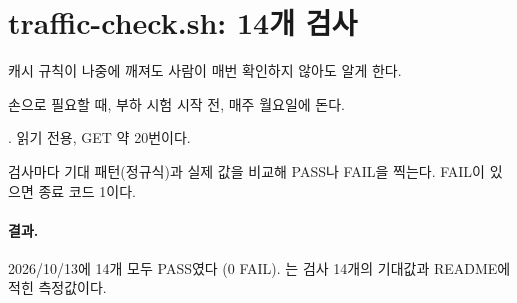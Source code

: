 \section{traffic-check.sh: 14개 검사}\label{sec:07-trafficcheck}

\begin{inbrief}
  \item[Why] 캐시 규칙이 나중에 깨져도 사람이 매번 확인하지 않아도 알게 한다.
  \item[When] 손으로 필요할 때, 부하 시험 시작 전, 매주 월요일에 돈다.
  \item[Where] . 읽기 전용, GET 약 20번이다.
  \item[How] 검사마다 기대 패턴(정규식)과 실제 값을 비교해 PASS나 FAIL을 찍는다. FAIL이 있으면 종료 코드 1이다.
\end{inbrief}

\paragraph{결과.}
2026/10/13에 14개 모두 PASS였다 (0 FAIL).
는 검사 14개의 기대값과 README에 적힌 측정값이다.

